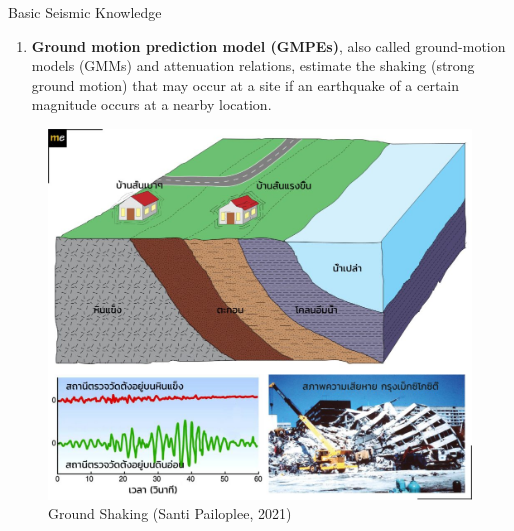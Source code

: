 \documentclass{beamer}
\newcounter{saveenumi}
\newcommand{\seti}{\setcounter{saveenumi}{\value{enumi}}}
\newcommand{\conti}{\setcounter{enumi}{\value{saveenumi}}}
\begin{document}
	\begin{frame}[t]{Basic Seismic Knowledge}
		\begin{enumerate}
			\conti
			\item \textbf{Ground motion prediction model (GMPEs)}, also called ground-motion models 
			(GMMs) and attenuation relations, estimate the shaking (strong ground motion) that may occur 
			at a site if an earthquake of a certain magnitude occurs at a nearby location.
			\seti
		\end{enumerate}
		
		\begin{figure}
			\centering
			\includegraphics[scale=0.5]{shak.jpg}
			\caption{Ground Shaking (Santi Pailoplee, 2021)}
		\end{figure}
	\end{frame}
	
\end{document}
